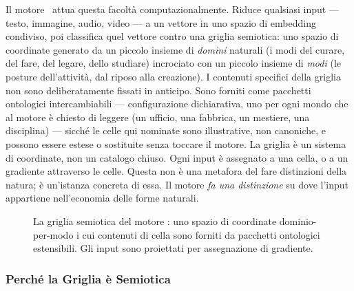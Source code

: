 Il motore \physis\ attua questa facolt\`a computazionalmente. Riduce
qualsiasi input --- testo, immagine, audio, video --- a un vettore in uno
spazio di embedding condiviso, poi classifica quel vettore contro una
griglia semiotica: uno spazio di coordinate generato da un piccolo insieme di
\emph{domini} naturali (i modi del curare, del fare, del legare, dello studiare)
incrociato con un piccolo insieme di \emph{modi} (le posture dell'attivit\`a, dal
riposo alla creazione). I contenuti specifici della griglia non sono
deliberatamente fissati in anticipo. Sono forniti come pacchetti ontologici
intercambiabili --- configurazione dichiarativa, uno per ogni mondo che al motore
\`e chiesto di leggere (un ufficio, una fabbrica, un mestiere, una disciplina) ---
sicch\'e le celle qui nominate sono illustrative, non canoniche, e possono essere
estese o sostituite senza toccare il motore. La griglia \`e un sistema di
coordinate, non un catalogo chiuso. Ogni input \`e assegnato a una cella, o a un
gradiente attraverso le celle. Questa non \`e una metafora del fare distinzioni
della natura; \`e un'istanza concreta di essa. Il motore \emph{fa una
distinzione} su dove l'input appartiene nell'economia delle forme naturali.

\begin{figure}[ht]
\centering
{}
\caption{La griglia semiotica del motore \physis: uno spazio di coordinate
dominio-per-modo i cui contenuti di cella sono forniti da pacchetti ontologici
estensibili. Gli input sono proiettati per
assegnazione di gradiente.\label{fig:semiotic_grid_italiano}}
\end{figure}

\subsubsection{Perch\'e la Griglia \`e Semiotica}

